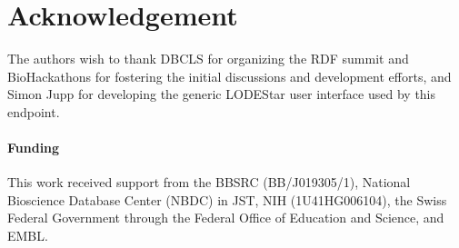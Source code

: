 \documentclass{bioinfo}
\begin{document}
\section*{Acknowledgement}
The authors wish to thank DBCLS for organizing the RDF summit and BioHackathons for fostering the initial discussions and development efforts, and Simon Jupp for developing the generic LODEStar user interface used by this endpoint.

\paragraph{Funding\textcolon} 
This work received support from the BBSRC (BB/J019305/1), National Bioscience Database Center (NBDC) in JST, NIH (1U41HG006104), the Swiss Federal Government through the Federal Office of Education and Science, and EMBL.  


%
%
%
%
%
%
  
\end{document}
